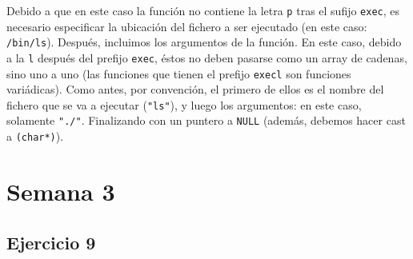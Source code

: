 \documentclass{article}
\begin{document}
Debido a que en este caso la función no contiene la letra \texttt{p} tras el sufijo \texttt{exec}, es necesario especificar la ubicación del fichero a ser ejecutado (en este caso: \texttt{/bin/ls}). Después, incluimos los argumentos de la función. En este caso, debido a la \texttt{l} después del prefijo \texttt{exec}, éstos no deben pasarse como un array de cadenas, sino uno a uno (las funciones que tienen el prefijo \texttt{execl} son funciones variádicas). Como antes, por convención, el primero de ellos es el nombre del fichero que se va a ejecutar (\texttt{"ls"}), y luego los argumentos: en este caso, solamente \texttt{"./"}. Finalizando con un puntero a \texttt{NULL} (además, debemos hacer cast a \texttt{(char*)}).

\section*{Semana 3}

\subsection*{Ejercicio 9}
\end{document}
